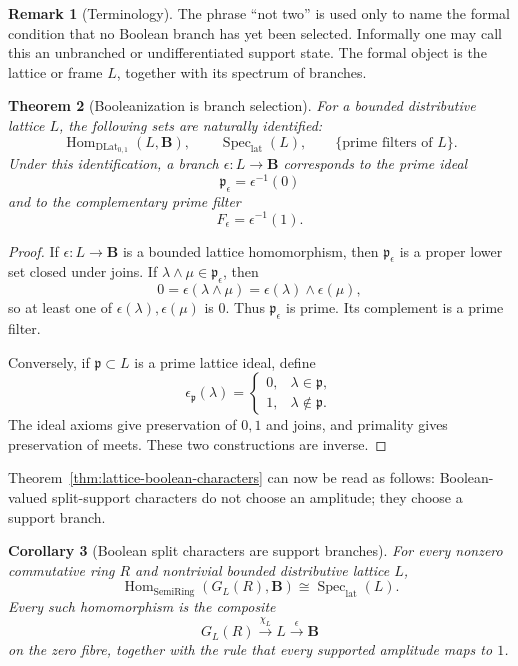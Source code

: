 \documentclass[11pt]{amsart}
\numberwithin{equation}{section}
\newtheorem{theorem}{Theorem}[section]
\newtheorem{corollary}[theorem]{Corollary}
\theoremstyle{definition}
\newtheorem{remark}[theorem]{Remark}
\newcommand{\B}{\mathbf B}
\newcommand{\Hom}{\operatorname{Hom}}
\newcommand{\SpecLat}{\operatorname{Spec}_{\mathrm{lat}}}
\DeclareMathOperator{\SemiRing}{SemiRing}
\begin{document}
\begin{remark}[Terminology]
The phrase ``not two'' is used only to name the formal condition that no
Boolean branch has yet been selected.  Informally one may call this an
unbranched or undifferentiated support state.  The formal object is the
lattice or frame $L$, together with its spectrum of branches.
\end{remark}

\begin{theorem}[Booleanization is branch selection]
\label{thm:booleanization-prime-branches}
For a bounded distributive lattice $L$, the following sets are naturally
identified:
\[
\Hom_{\mathrm{DLat}_{0,1}}(L,\B),
\qquad
\SpecLat(L),
\qquad
\{\text{prime filters of }L\}.
\]
Under this identification, a branch $\epsilon:L\to\B$ corresponds to the
prime ideal
\[
\mathfrak p_\epsilon=\epsilon^{-1}(0)
\]
and to the complementary prime filter
\[
F_\epsilon=\epsilon^{-1}(1).
\]
\end{theorem}

\begin{proof}
If $\epsilon:L\to\B$ is a bounded lattice homomorphism, then
$\mathfrak p_\epsilon$ is a proper lower set closed under joins.  If
$\lambda\wedge\mu\in\mathfrak p_\epsilon$, then
\[
0=\epsilon(\lambda\wedge\mu)=\epsilon(\lambda)\wedge\epsilon(\mu),
\]
so at least one of $\epsilon(\lambda),\epsilon(\mu)$ is $0$.  Thus
$\mathfrak p_\epsilon$ is prime.  Its complement is a prime filter.

Conversely, if $\mathfrak p\subset L$ is a prime lattice ideal, define
\[
\epsilon_{\mathfrak p}(\lambda)=
\begin{cases}
0,&\lambda\in\mathfrak p,\\
1,&\lambda\notin\mathfrak p.
\end{cases}
\]
The ideal axioms give preservation of $0,1$ and joins, and primality gives
preservation of meets.  These two constructions are inverse.
\end{proof}

Theorem~\ref{thm:lattice-boolean-characters} can now be read as follows:
Boolean-valued split-support characters do not choose an amplitude; they
choose a support branch.

\begin{corollary}[Boolean split characters are support branches]
\label{cor:boolean-split-characters-branches}
For every nonzero commutative ring $R$ and nontrivial bounded distributive
lattice $L$,
\[
\boxed{
\Hom_{\SemiRing}(G_L(R),\B)
\cong
\SpecLat(L).
}
\]
Every such homomorphism is the composite
\[
G_L(R)\xrightarrow{\chi_L}L\xrightarrow{\epsilon}\B
\]
on the zero fibre, together with the rule that every supported amplitude
maps to $1$.
\end{corollary}
\end{document}
